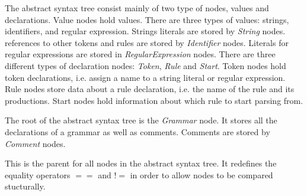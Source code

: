 
The abstract syntax tree consist mainly of two type of nodes, values and declarations. Value nodes hold values. There are three types of values: strings, identifiers, and regular expression. Strings literals are stored by \textit{String} nodes. references to other tokens and rules are stored by \textit{Identifier} nodes. Literals for regular expressions are stored in \textit{RegularExpression} nodes.
There are three different types of declaration nodes: \textit{Token}, \textit{Rule} and \textit{Start}. Token nodes hold token declarations, i.e. assign a name to a string literal or regular expression. Rule nodes store data about a rule declaration, i.e. the name of the rule and its productions. Start nodes hold information about which rule to start parsing from.


The root of the abstract syntax tree is the \textit{Grammar} node. It stores all the declarations of a grammar as well as comments. Comments are stored by \textit{Comment} nodes.




This is the parent for all nodes in the abstract syntax tree. It redefines the equality operators $==$ and $!=$ in order to allow nodes to be compared stucturally.
